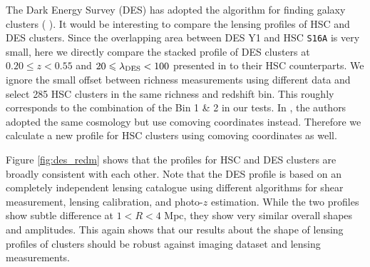 \documentclass[fleqn,usenatbib,useAMS]{mnras}
\begin{document}
\begin{CJK*}{UTF8}{gbsn}
	The Dark Energy Survey (DES) has adopted the \redm{} algorithm for finding galaxy clusters
	(\eg{} \citealt{Rykoff2016}).
	It would be interesting to compare the lensing profiles of HSC and DES \redm{} clusters.
	Since the overlapping area between DES Y1 and HSC \texttt{S16A} is very small, here we 
	directly compare the stacked \dsigma{} profile of DES \redm{} clusters at $0.20 \leq z < 0.55$
	and $20 \leq \lambda_{\rm DES} < 100$ presented in \citet{Chang2018} to their HSC counterparts.
	We ignore the small offset between richness measurements using different data and select
	285 HSC \redm{} clusters in the same richness and redshift bin.
	This roughly corresponds to the combination of the Bin 1 \& 2 in our \topn{} tests.
	In \citet{Chang2018}, the authors adopted the same cosmology but use comoving coordinates 
	instead. 
	Therefore we calculate a new \dsigma{} profile for HSC clusters using comoving coordinates as
	well. 
	
	Figure \ref{fig:des_redm} shows that the \dsigma{} profiles for HSC and DES \redm{} clusters
	are broadly consistent with each other.
	Note that the DES \dsigma{} profile is based on an completely independent lensing catalogue 
	using different algorithms for shear measurement, lensing calibration, and photo-$z$ estimation.
	While the two profiles show subtle difference at $1 < R < 4$ Mpc, they show very similar overall
	shapes and amplitudes.
	This again shows that our results about the shape of lensing profiles of \redm{} clusters 
	should be robust against imaging dataset and lensing measurements.
	

\end{CJK*}
\end{document}
